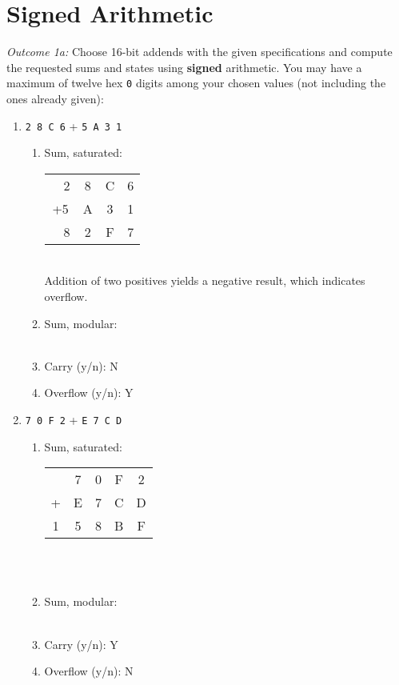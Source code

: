 \documentclass[11pt]{article}
\begin{document}
\section{Signed Arithmetic}

\emph{Outcome 1a:} Choose 16-bit addends with the given specifications and compute the requested
sums and states using \textbf{signed} arithmetic. You may have a maximum of twelve hex
\texttt{0} digits among your chosen values (not including the ones already given):

\begin{enumerate}
\item \texttt{2 8 C 6} \quad + \quad \texttt{5 A 3 1}
\begin{enumerate}
\item Sum, saturated:\\[2pt]
\begin{tabular}{c c c c}
	{\ \ }2&8&C&6\\
	+5&A&3&1\\
	\hline
	{\ \ }8&2&F&7
\end{tabular}\\[2pt]


Addition of two positives yields a negative result, which indicates overflow.


\item Sum, modular:\\[2pt]

\\
\item Carry (y/n): N
\item Overflow (y/n): Y
\end{enumerate}

\item \texttt{7 0 F 2} \quad + \quad \texttt{E 7 C D} 
\begin{enumerate}
\item Sum, saturated:\\[2pt]
\begin{tabular}{c c c c c}
&7&0&F&2\\
+&E&7&C&D\\
\hline
1&5&8&B&F
\end{tabular}\\[2pt]

\\

\item Sum, modular:\\[2pt]
\\
\item Carry (y/n): Y
\item Overflow (y/n): N
\end{enumerate}


\end{enumerate}
\end{document}
